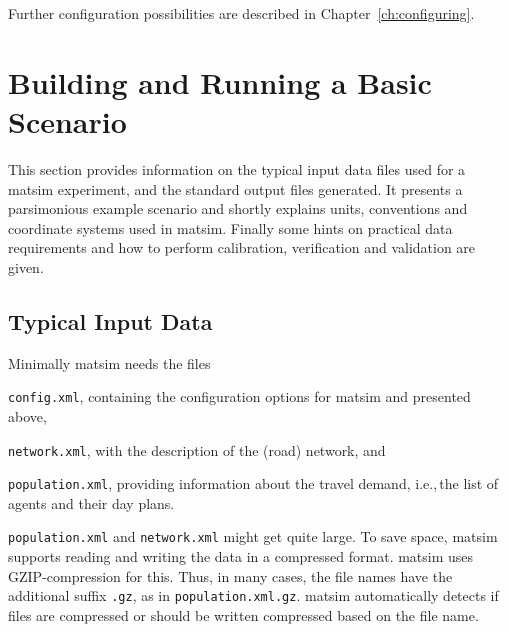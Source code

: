 Further configuration possibilities are described in Chapter~\ref{ch:configuring}.

\section{Building and Running a Basic Scenario}
\label{sec:buildingbasicscenario}
This section provides information on the typical input data files used for a \gls{matsim} experiment, and the standard output files generated. It presents a parsimonious example scenario and shortly explains units, conventions and coordinate systems used in \gls{matsim}. Finally some hints on practical data requirements and how to perform calibration, verification and validation are given.

\subsection{Typical Input Data}
\label{sec:inputdata}
Minimally \gls{matsim} needs the files
\begin{compactitem}
	\item \lstinline|config.xml|, containing the configuration options for \gls{matsim} and presented above,
	\item \lstinline|network.xml|, with the description of the (road) network, and
	\item \lstinline|population.xml|, providing information about	the travel demand, i.e.,\,the list of agents and their day plans.
\end{compactitem}


\lstinline|population.xml| and \lstinline|network.xml| 
might get quite large. To save space, \gls{matsim} supports reading and writing the data in a compressed format. \gls{matsim} uses GZIP-compression for this. Thus, in many cases, the file names have the additional suffix \lstinline|.gz|, as in \lstinline|population.xml.gz|. \gls{matsim} automatically detects if files are compressed or should be written compressed based on the file name.


